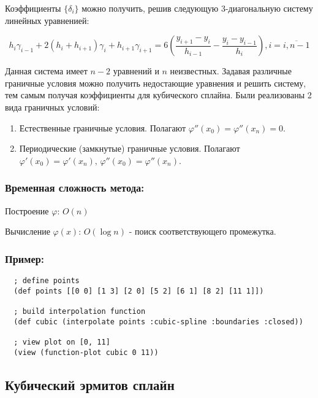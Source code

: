 Коэффициенты $\{\delta_i\}$ можно получить, решив следующую 3-диагональную систему линейных уравненией:

\begin{equation}
  h_i \gamma_{i-1} + 2(h_i + h_{i+1})\gamma_i + h_{i+1}\gamma_{i+1} =
  6 (\frac{y_{i+1} - y_i}{h_{i-1}} - \frac{y_i - y_{i-1}}{h_i}), i = \overline{i, n - 1}
\end{equation}

Данная система имеет $n-2$ уравнений и $n$ неизвестных. Задавая различные граничные условия можно получить недостающие уравнения и решить систему, тем самым получая коэффициенты для кубического сплайна. Были реализованы 2 вида граничных условий:

\begin{enumerate}
\item Естественные граничные условия. Полагают $\varphi''(x_0)= \varphi''(x_n)=0$.
\item Периодические (замкнутые) граничные условия. Полагают $\varphi'(x_0)=\varphi'(x_n),\, \varphi''(x_0)=\varphi''(x_n)$.
\end{enumerate}

\subsubsection{Временная сложность метода:}

Построение $\varphi$: $O(n)$

Вычисление $\varphi(x)$: $O(\log n)$ - поиск соответствующего промежутка.

\subsubsection{Пример:}

\begin{verbatim}
  ; define points
  (def points [[0 0] [1 3] [2 0] [5 2] [6 1] [8 2] [11 1]])

  ; build interpolation function
  (def cubic (interpolate points :cubic-spline :boundaries :closed))

  ; view plot on [0, 11]
  (view (function-plot cubic 0 11))
\end{verbatim}



\subsection{Кубический эрмитов сплайн}

